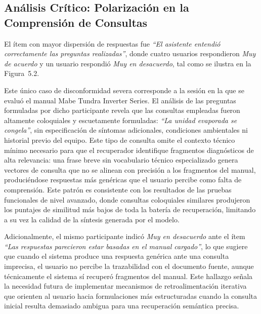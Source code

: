 {{\subsection{Análisis Crítico: Polarización en la Comprensión de Consultas}
\label{sec:polarizacion}

El ítem con mayor dispersión de respuestas fue \textit{``El asistente entendió correctamente las preguntas realizadas''}, donde cuatro usuarios respondieron \textit{Muy de acuerdo} y un usuario respondió \textit{Muy en desacuerdo}, tal como se ilustra en la Figura~5.2.

Este único caso de disconformidad severa corresponde a la sesión en la que se evaluó el manual Mabe Tundra Inverter Series. El análisis de las preguntas formuladas por dicho participante revela que las consultas empleadas fueron altamente coloquiales y escuetamente formuladas: \textit{``La unidad evaporada se congela''}, sin especificación de síntomas adicionales, condiciones ambientales ni historial previo del equipo. Este tipo de consulta omite el contexto técnico mínimo necesario para que el recuperador identifique fragmentos diagnósticos de alta relevancia: una frase breve sin vocabulario técnico especializado genera vectores de consulta que no se alinean con precisión a los fragmentos del manual, produciéndose respuestas más genéricas que el usuario percibe como falta de comprensión. Este patrón es consistente con los resultados de las pruebas funcionales de nivel avanzado, donde consultas coloquiales similares produjeron los puntajes de similitud más bajos de toda la batería de recuperación, limitando a su vez la calidad de la síntesis generada por el modelo.


Adicionalmente, el mismo participante indicó \textit{Muy en desacuerdo} ante el ítem \textit{``Las respuestas parecieron estar basadas en el manual cargado''}, lo que sugiere que cuando el sistema produce una respuesta genérica ante una consulta imprecisa, el usuario no percibe la trazabilidad con el documento fuente, aunque técnicamente el sistema sí recuperó fragmentos del manual. Este hallazgo señala la necesidad futura de implementar mecanismos de retroalimentación iterativa que orienten al usuario hacia formulaciones más estructuradas cuando la consulta inicial resulta demasiado ambigua para una recuperación semántica precisa.

}}
